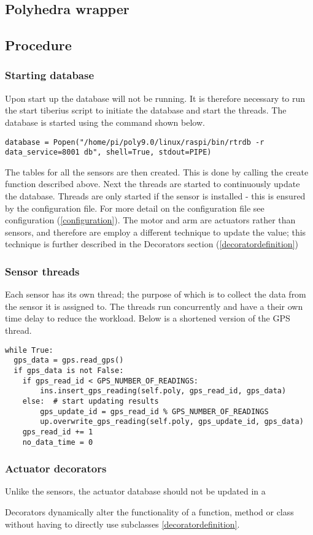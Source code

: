\subsection{Polyhedra wrapper}





\subsection{Procedure}
\subsubsection{Starting database}
Upon start up the database will not be running. It is therefore necessary to run the start tiberius script to initiate the database and start the threads. The database is started using the command shown below.

\begin{lstlisting}
database = Popen("/home/pi/poly9.0/linux/raspi/bin/rtrdb -r data_service=8001 db", shell=True, stdout=PIPE)
\end{lstlisting}

The tables for all the sensors are then created. This is done by calling the create function described above. Next the threads are started to continuously update the database. Threads are only started if the sensor is installed - this is ensured by the configuration file. For more detail on the configuration file see configuration  (\ref{configuration}). The motor and arm are actuators rather than sensors, and therefore are employ a different technique to update the value; this technique is further described in the Decorators section (\ref{decoratordefinition})

\subsubsection{Sensor threads}
Each sensor has its own thread; the purpose of which is to collect the data from the sensor it is assigned to. The threads run concurrently and have a their own time delay to reduce the workload.
Below is a shortened version of the GPS thread.
\begin{lstlisting}
while True:
  gps_data = gps.read_gps()
  if gps_data is not False:
    if gps_read_id < GPS_NUMBER_OF_READINGS:
   		ins.insert_gps_reading(self.poly, gps_read_id, gps_data)
    else:  # start updating results
   		gps_update_id = gps_read_id % GPS_NUMBER_OF_READINGS
    	up.overwrite_gps_reading(self.poly, gps_update_id, gps_data)
    gps_read_id += 1
    no_data_time = 0
\end{lstlisting}

\subsubsection{Actuator decorators}
Unlike the sensors, the actuator database should not be updated in a

\label{decoratordefinition}
Decorators dynamically alter the functionality of a function, method or class without having to directly use subclasses \ref{decoratordefinition}.
